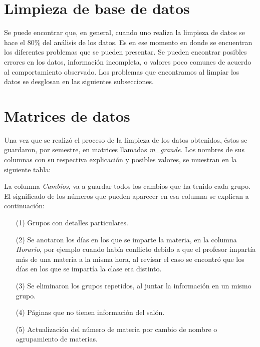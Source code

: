 \section{Limpieza de base de datos} \label{sec_ED_LimpiezaDatos}

Se puede encontrar que, en general, cuando uno realiza la limpieza de datos se hace el 80\% del análisis de los datos. Es en ese momento en donde se encuentran los diferentes problemas que se pueden presentar. Se pueden encontrar posibles errores en los datos, información incompleta, o valores poco comunes de acuerdo al comportamiento observado. Los problemas que encontramos al limpiar los datos se desglosan en las siguientes subsecciones.


\section{Matrices de datos}

Una vez que se realizó el proceso de la limpieza de los datos obtenidos, éstos se guardaron, por semestre, en matrices llamadas \textit{m\_grande}. Los nombres de sus columnas con su respectiva explicación y posibles valores, se muestran en la siguiente tabla:

\dfNmatrizGrande %

La columna \textit{Cambios}, va a guardar todos los cambios que ha tenido cada grupo. El significado de los números que pueden aparecer en esa columna se explican a continuación:

\begin{enumerate}
\item[(1)] Grupos con detalles particulares.

\item[(2)] Se anotaron los días en los que se imparte la materia, en la columna \textit{Horario}, por ejemplo cuando había conflicto debido a que el profesor impartía más de una materia a la misma hora, al revisar el caso se encontró que los días en los que se impartía la clase era distinto.

\item[(3)] Se eliminaron los grupos repetidos, al juntar la información en un mismo grupo.

\item[(4)] Páginas que no tienen información del salón.

\item[(5)] Actualización del número de materia por cambio de nombre o agrupamiento de materias.
\end{enumerate}
